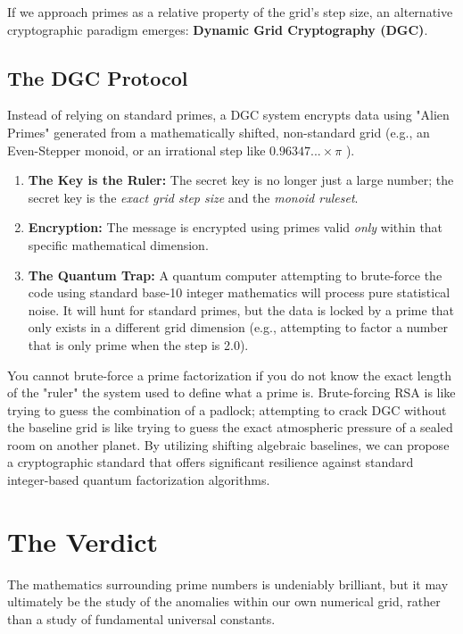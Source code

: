 \documentclass[12pt]{article}
\begin{document}
If we approach primes as a relative property of the grid's step size, an alternative cryptographic paradigm emerges: \textbf{Dynamic Grid Cryptography (DGC)}.

\subsection{The DGC Protocol}
Instead of relying on standard primes, a DGC system encrypts data using "Alien Primes" generated from a mathematically shifted, non-standard grid (e.g., an Even-Stepper monoid, or an irrational step like $ 0.96347... \times \pi $ ).

\begin{enumerate}
    \item \textbf{The Key is the Ruler:} The secret key is no longer just a large number; the secret key is the \textit{exact grid step size} and the \textit{monoid ruleset}.
    \item \textbf{Encryption:} The message is encrypted using primes valid \textit{only} within that specific mathematical dimension.
    \item \textbf{The Quantum Trap:} A quantum computer attempting to brute-force the code using standard base-10 integer mathematics will process pure statistical noise. It will hunt for standard primes, but the data is locked by a prime that only exists in a different grid dimension (e.g., attempting to factor a number that is only prime when the step is 2.0).
\end{enumerate}

You cannot brute-force a prime factorization if you do not know the exact length of the "ruler" the system used to define what a prime is. Brute-forcing RSA is like trying to guess the combination of a padlock; attempting to crack DGC without the baseline grid is like trying to guess the exact atmospheric pressure of a sealed room on another planet. By utilizing shifting algebraic baselines, we can propose a cryptographic standard that offers significant resilience against standard integer-based quantum factorization algorithms.

\section{The Verdict}
The mathematics surrounding prime numbers is undeniably brilliant, but it may ultimately be the study of the anomalies within our own numerical grid, rather than a study of fundamental universal constants.
\end{document}
